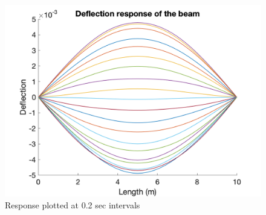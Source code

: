 \documentclass[10pt]{article}
\begin{document}
	 
\begin{figure}[h!]
	\centering
	\includegraphics[scale=.25]{Response.png}
	\caption{Response plotted at 0.2 sec intervals}
	\label{Response}
\end{figure}



%
\end{document}

